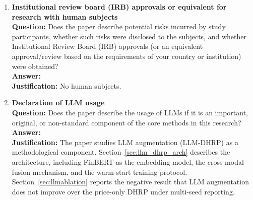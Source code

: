 \begin{enumerate}
\item {\bf Institutional review board (IRB) approvals or equivalent for research with human subjects}\\
\textbf{Question:} Does the paper describe potential risks incurred by study participants, whether such risks were disclosed to the subjects, and whether Institutional Review Board (IRB) approvals (or an equivalent approval/review based on the requirements of your country or institution) were obtained?\\
\textbf{Answer:} \answerNA{}\\
\textbf{Justification:} No human subjects.

\item {\bf Declaration of LLM usage}\\
\textbf{Question:} Does the paper describe the usage of LLMs if it is an important, original, or non-standard component of the core methods in this research?\\
\textbf{Answer:} \answerYes{}\\
\textbf{Justification:} The paper studies LLM augmentation (LLM-DHRP) as a methodological component. Section~\ref{sec:llm_dhrp_arch} describes the architecture, including FinBERT \citep{Huang2023} as the embedding model, the cross-modal fusion mechanism, and the warm-start training protocol. Section~\ref{sec:llmablation} reports the negative result that LLM augmentation does not improve over the price-only DHRP under multi-seed reporting.
\end{enumerate}
